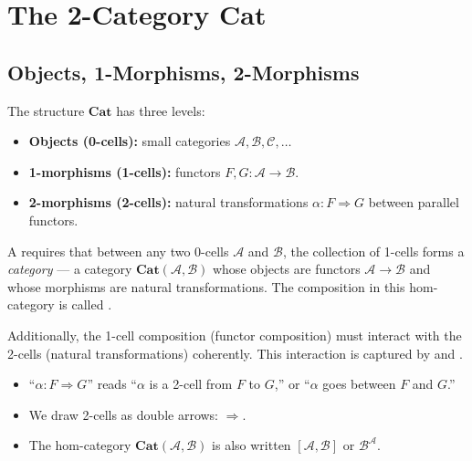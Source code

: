 \section{The 2-Category \texorpdfstring{$\mathbf{Cat}$}{Cat}}
\label{sec:2cat-cat}

\subsection{Objects, 1-Morphisms, 2-Morphisms}

The structure $\mathbf{Cat}$ has three levels:
\begin{itemize}
  \item \textbf{Objects (0-cells):} small categories $\mathcal{A},
        \mathcal{B}, \mathcal{C}, \ldots$
  \item \textbf{1-morphisms (1-cells):} functors $F, G : \mathcal{A} \to
        \mathcal{B}$.
  \item \textbf{2-morphisms (2-cells):} natural transformations
        $\alpha : F \Rightarrow G$ between parallel functors.
\end{itemize}

A  requires that between any two 0-cells $\mathcal{A}$
and $\mathcal{B}$, the collection of 1-cells forms a \emph{category}
--- a category $\mathbf{Cat}(\mathcal{A}, \mathcal{B})$ whose objects
are functors $\mathcal{A} \to \mathcal{B}$ and whose morphisms are
natural transformations. The composition in this hom-category is called
.

Additionally, the 1-cell composition (functor composition) must interact
with the 2-cells (natural transformations) coherently. This interaction
is captured by  and .

\begin{howtosay}
\begin{itemize}
  \item ``$\alpha : F \Rightarrow G$'' reads ``$\alpha$ is a 2-cell from
        $F$ to $G$,'' or ``$\alpha$ goes between $F$ and $G$.''
  \item We draw 2-cells as double arrows: $\Rightarrow$.
  \item The hom-category $\mathbf{Cat}(\mathcal{A}, \mathcal{B})$ is also
        written $[\mathcal{A}, \mathcal{B}]$ or $\mathcal{B}^\mathcal{A}$.
\end{itemize}
\end{howtosay}

